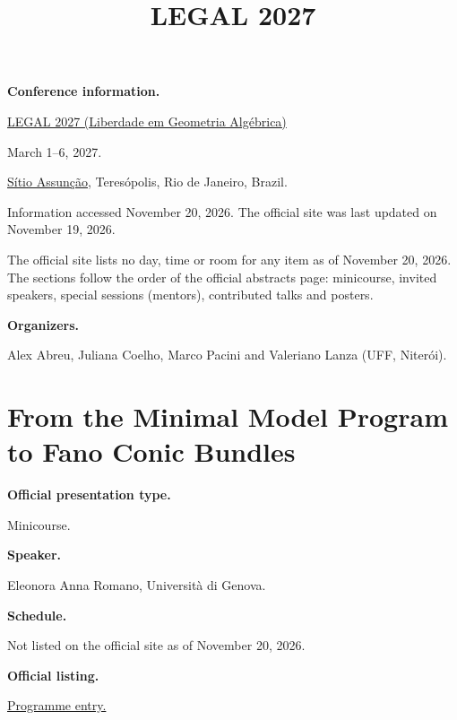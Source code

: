 



\title{LEGAL 2027}
\maketitle
{}
\label{section-phantom}
\tableofcontents

\medskip\noindent
{\bf Conference information.}

\href{%
https://sites.google.com/view/%
geoalgcompluff/legal%
}{LEGAL 2027 (Liberdade em Geometria
Alg\'ebrica)}

March 1--6, 2027.

\href{https://sitioassuncao.wordpress.com}{%
S\'itio Assun\c{c}\~ao},
Teresópolis, Rio de Janeiro, Brazil.

Information accessed November 20, 2026.
The official site was last updated on
November 19, 2026.

The official site lists no day, time or
room for any item as of November 20, 2026.
The sections follow the order of the
official abstracts page: minicourse,
invited speakers, special sessions
(mentors), contributed talks and posters.

\medskip\noindent
{\bf Organizers.}

Alex Abreu, Juliana Coelho, Marco Pacini
and Valeriano Lanza (UFF, Niter\'oi).

\section{From the Minimal Model Program to
Fano Conic Bundles}
\label{section-from-the-minimal-model}

\medskip\noindent
{\bf Official presentation type.}

Minicourse.

\medskip\noindent
{\bf Speaker.}

Eleonora Anna Romano, Università di Genova.

\medskip\noindent
{\bf Schedule.}

Not listed on the official site as of
November 20, 2026.

\medskip\noindent
{\bf Official listing.}

\href{%
https://sites.google.com/view/%
geoalgcompluff/legal/%
legal-2027-resumos#h.c1v018hrntqh%
}{Programme entry.}

